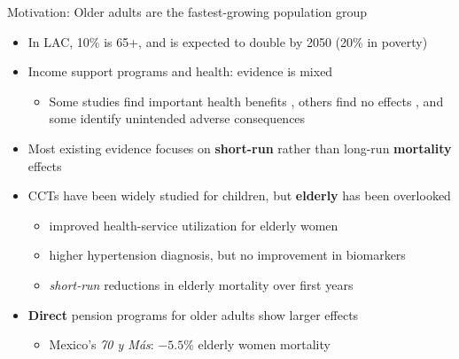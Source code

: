 \documentclass[aspectratio=169,usenames,dvipsnames]{beamer}
\newcommand{\smallcite}[1]{{\footnotesize\textcolor{Blue}{\citep{#1}}}}
\begin{document}
\begin{frame}{Motivation: Older adults are the fastest-growing population group}\label{motivation}
\vspace{2pt}
\small
\begin{itemize}
  \item[$\circ$] In LAC, 10\% is 65+, and is expected to double by 2050 (20\%  in poverty) \smallcite{UN2024WPP} 
  \item[$\circ$] Income support programs and health: evidence is mixed
    \begin{itemize}
      \item Some studies find important health benefits \smallcite{Case2004PerspectivesAging, Aguila2015PNAS}, others find no effects \smallcite{LloydSherlockAgrawal2014JDS}, and some identify unintended adverse consequences \smallcite{FernaldGertlerHou2008JN}
    \end{itemize}
  \vspace{4pt}
  \item[$\circ$] Most existing evidence focuses on \textbf{short-run} rather than long-run \textbf{mortality} effects
  \vspace{4pt}
  \item[$\circ$] CCTs have been widely studied for children, but \textbf{elderly} has been overlooked
    \begin{itemize}
      \item improved health-service utilization for elderly women \smallcite{BehrmanParker2013Demography}
      \item higher hypertension diagnosis, but no improvement in biomarkers \smallcite{aguila2024conditional}
      \item
      \textit{short-run} reductions in elderly mortality over first years \smallcite{BarhamRowberry2013JDE}
    \end{itemize}
  \vspace{4pt}
  \item[$\circ$] \textbf{Direct} pension programs for older adults show larger effects
    \begin{itemize}
      \item Mexico's \textit{70 y Más}: $-5.5\%$ elderly women mortality \smallcite{Menares2026JHR}
    \end{itemize}
\end{itemize}
\end{frame}

\end{document}

